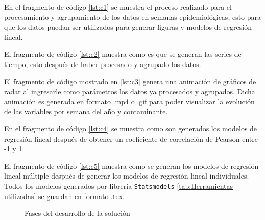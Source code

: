 \begin{description}
\item{En el fragmento de código \ref{lst:c1} se muestra el proceso realizado para el procesamiento y agrupamiento de los datos en semanas epidemiológicas, esto para que los datos puedan ser utilizados para generar figuras y modelos de regresión lineal.}
\item{El fragmento de código \ref{lst:c2} muestra como es que se generan las series de tiempo, esto después de haber procesado y agrupado los datos.}
\item{El fragmento de código mostrado en \ref{lst:c3} genera una animación de gráficos de radar al ingresarle como parámetros los datos ya procesados y agrupados. Dicha animación es generada en formato .mp4 o .gif para poder visualizar la evolución de las variables por semana del año y contaminante.}
\item{En el fragmento de código \ref{lst:c4} se muestra como son generados los modelos de regresión lineal después de obtener un coeficiente de correlación de Pearson entre -1 y 1.}
\item{El fragmento de código \ref{lst:c5} muestra como se generan los modelos de regresión lineal múltiple después de generar los modelos de regresión lineal individuales. Todos los modelos generados por librería \texttt{Statsmodels} \ref{tab:Herramientas utilizadas} se guardan en formato .tex.}
\end{description}

\begin{figure}[H]
\caption{Fases del desarrollo de la solución}
\label{Diagrama de flujo de las fases}
\end{figure}

